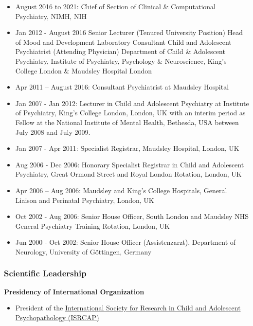 \documentclass[
]{article}
\providecommand{\tightlist}{%
  \setlength{\itemsep}{0pt}\setlength{\parskip}{0pt}}
\begin{document}
\begin{itemize}
\tightlist
\item
  August 2016 to 2021: Chief of Section of Clinical \& Computational
  Psychiatry, NIMH, NIH
\item
  Jan 2012 - August 2016 Senior Lecturer (Tenured University Position)
  Head of Mood and Development Laboratory Consultant Child and
  Adolescent Psychiatrist (Attending Physician) Department of Child \&
  Adolescent Psychiatry, Institute of Psychiatry, Psychology \&
  Neuroscience, King's College London \& Maudsley Hospital London
\item
  Apr 2011 -- August 2016: Consultant Psychiatrist at Maudsley Hospital
\item
  Jan 2007 - Jan 2012: Lecturer in Child and Adolescent Psychiatry at
  Institute of Psychiatry, King's College London, London, UK with an
  interim period as Fellow at the National Institute of Mental Health,
  Bethesda, USA between July 2008 and July 2009.
\item
  Jan 2007 - Apr 2011: Specialist Registrar, Maudsley Hospital, London,
  UK
\item
  Aug 2006 - Dec 2006: Honorary Specialist Registrar in Child and
  Adolescent Psychiatry, Great Ormond Street and Royal London Rotation,
  London, UK
\item
  Apr 2006 -- Aug 2006: Maudsley and King's College Hospitals, General
  Liaison and Perinatal Psychiatry, London, UK
\item
  Oct 2002 - Aug 2006: Senior House Officer, South London and Maudsley
  NHS General Psychiatry Training Rotation, London, UK
\item
  Jun 2000 - Oct 2002: Senior House Officer (Assistenzarzt), Department
  of Neurology, University of Göttingen, Germany
\end{itemize}

\hypertarget{scientific-leadership}{%
\subsubsection{Scientific Leadership}\label{scientific-leadership}}

\textbf{Presidency of International Organization}

\begin{itemize}
\tightlist
\item
  President of the
  \href{https://isrcap.org/executive-committee.html}{International
  Society for Research in Child and Adolescent Psychopathology (ISRCAP)}
\end{itemize}
\end{document}

